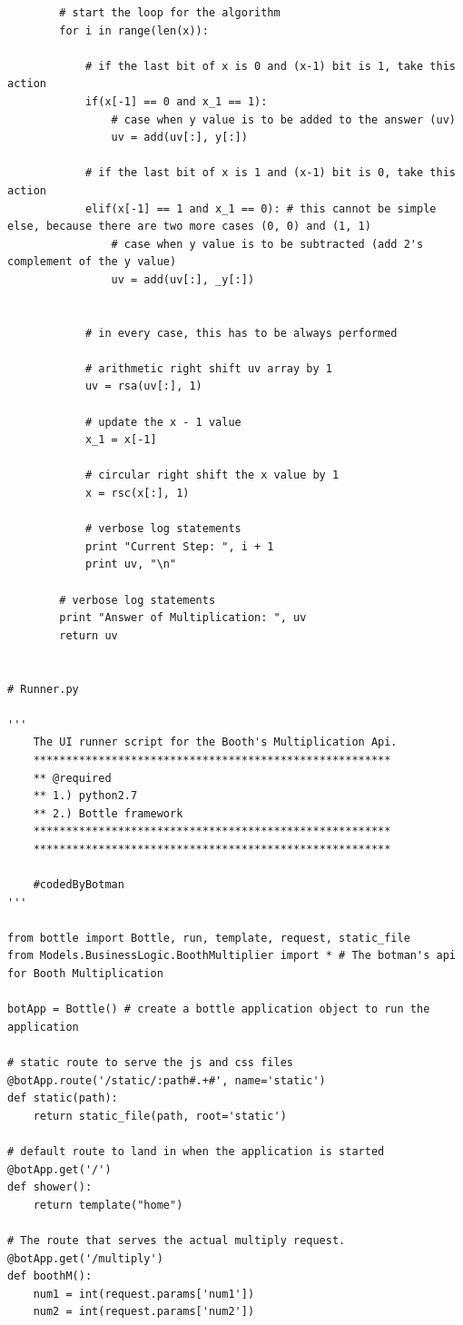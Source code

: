 \documentclass[10pt,a4paper]{article}
\newenvironment{changemargin}[2]{%
\begin{list}{}{%
\setlength{\topsep}{0pt}%
\setlength{\leftmargin}{#1}%
\setlength{\rightmargin}{#2}%
\setlength{\listparindent}{\parindent}%
\setlength{\itemindent}{\parindent}%
\setlength{\parsep}{\parskip}%
}%
\item[]}{\end{list}}
\begin{document}
\begin{changemargin}{-4cm}{-4cm}
\begin{lstlisting}
		# start the loop for the algorithm
		for i in range(len(x)):

			# if the last bit of x is 0 and (x-1) bit is 1, take this action
			if(x[-1] == 0 and x_1 == 1):
				# case when y value is to be added to the answer (uv)
				uv = add(uv[:], y[:])

			# if the last bit of x is 1 and (x-1) bit is 0, take this action
			elif(x[-1] == 1 and x_1 == 0): # this cannot be simple else, because there are two more cases (0, 0) and (1, 1)
				# case when y value is to be subtracted (add 2's complement of the y value)
				uv = add(uv[:], _y[:])


			# in every case, this has to be always performed

			# arithmetic right shift uv array by 1
			uv = rsa(uv[:], 1)

			# update the x - 1 value
			x_1 = x[-1]

			# circular right shift the x value by 1
			x = rsc(x[:], 1)

			# verbose log statements
			print "Current Step: ", i + 1
			print uv, "\n"

		# verbose log statements
		print "Answer of Multiplication: ", uv
		return uv
		

# Runner.py

'''
    The UI runner script for the Booth's Multiplication Api.
    *******************************************************
    ** @required
    ** 1.) python2.7
    ** 2.) Bottle framework
    *******************************************************
    *******************************************************

    #codedByBotman
'''

from bottle import Bottle, run, template, request, static_file
from Models.BusinessLogic.BoothMultiplier import * # The botman's api for Booth Multiplication

botApp = Bottle() # create a bottle application object to run the application

# static route to serve the js and css files
@botApp.route('/static/:path#.+#', name='static')
def static(path):
    return static_file(path, root='static')

# default route to land in when the application is started
@botApp.get('/')
def shower():
    return template("home")

# The route that serves the actual multiply request.
@botApp.get('/multiply')
def boothM():
    num1 = int(request.params['num1'])
    num2 = int(request.params['num2'])


\end{lstlisting}
\end{changemargin}
\end{document}

